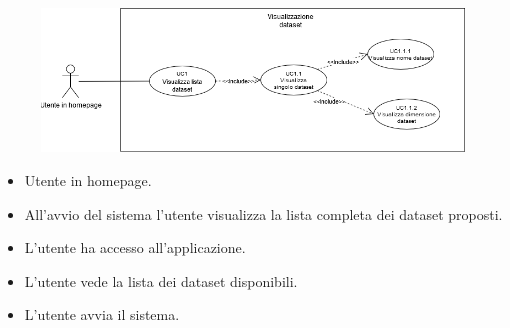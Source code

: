 
    \begin{figure}[h!]
        \centering
        \includegraphics[scale=0.55]{template/images/UC1.png}
        \caption{}
    \end{figure}
    \UCdsc
    { %
        \begin{itemize}
            \item Utente in homepage.
        \end{itemize}
    }
    { %
        \begin{itemize}
            \item All'avvio del sistema l'utente visualizza la lista completa dei dataset proposti.
        \end{itemize}
    }
    { %
        \begin{itemize}
            \item L'utente ha accesso all'applicazione.
        \end{itemize}
    }
    { %
        \begin{itemize}
            \item L'utente vede la lista dei dataset disponibili.
        \end{itemize}
    }
    { %
        \begin{itemize}
            \item L'utente avvia il sistema.
        \end{itemize}
    }


    \newpage

